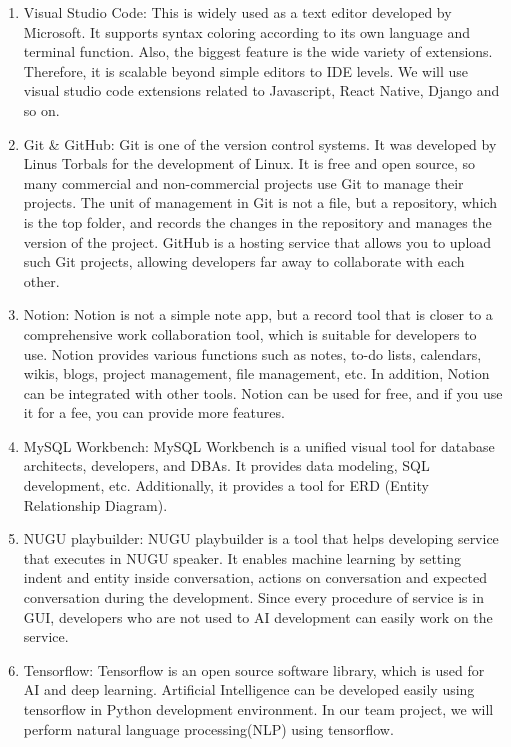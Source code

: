\documentclass[conference]{IEEEtran}
\begin{document}
\begin{enumerate}
    \begin{enumerate}
        \item Visual Studio Code:
        This is widely used as a text editor developed by Microsoft. It supports syntax coloring according to its own language and terminal function. Also, the biggest feature is the wide variety of extensions. Therefore, it is scalable beyond simple editors to IDE levels. We will use visual studio code extensions related to Javascript, React Native, Django and so on.
        \item Git \& GitHub:
        Git is one of the version control systems. It was developed by Linus Torbals for the development of Linux. It is free and open source, so many commercial and non-commercial projects use Git to manage their projects. The unit of management in Git is not a file, but a repository, which is the top folder, and records the changes in the repository and manages the version of the project. \hfill \break
        GitHub is a hosting service that allows you to upload such Git projects, allowing developers far away to collaborate with each other.
        \item Notion:
        Notion is not a simple note app, but a record tool that is closer to a comprehensive work collaboration tool, which is suitable for developers to use. Notion provides various functions such as notes, to-do lists, calendars, wikis, blogs, project management, file management, etc. In addition, Notion can be integrated with other tools. Notion can be used for free, and if you use it for a fee, you can provide more features.
        \item MySQL Workbench:
        MySQL Workbench is a unified visual tool for database architects, developers, and DBAs. It provides data modeling, SQL development, etc. Additionally, it provides a tool for ERD (Entity Relationship Diagram).
        \item NUGU playbuilder:
        NUGU playbuilder is a tool that helps developing service that executes in NUGU speaker. It enables machine learning by setting indent and entity inside conversation, actions on conversation and expected conversation during the development. Since every procedure of service is in GUI, developers who are not used to AI development can easily work on the service.
        \item Tensorflow:
        Tensorflow is an open source software library, which is used for AI and deep learning. Artificial Intelligence can be developed easily using tensorflow in Python development environment. In our team project, we will perform natural language processing(NLP) using tensorflow.
    \end{enumerate}
    \end{enumerate}
    
\end{document}
